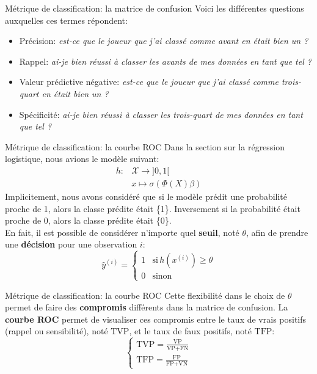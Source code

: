 \begin{frame}{Métrique de classification: la matrice de confusion}
	Voici les différentes questions auxquelles ces termes répondent:
	\begin{itemize}
		\item Précision: \textit{est-ce que le joueur que j'ai classé comme avant en était bien un ?}
		\item Rappel: \textit{ai-je bien réussi à classer les avants de mes données en tant que tel ?}
		\item Valeur prédictive négative: \textit{est-ce que le joueur que j'ai classé comme trois-quart en était bien un ?}
		\item Spécificité: \textit{ai-je bien réussi à classer les trois-quart de mes données en tant que tel ?}
	\end{itemize}
\end{frame}

\begin{frame}{Métrique de classification: la courbe ROC}
	Dans la section sur la régression logistique, nous avions le modèle suivant:
	\begin{equation}
		\begin{aligned}
			h: &\mathcal{X} \to ]0, 1[ \\
			&x \mapsto \sigma\left(\Phi(X) \beta\right)
		\end{aligned}
		\nonumber
	\end{equation}
	\pause
	Implicitement, nous avons considéré que si le modèle prédit une probabilité proche de 1, alors la classe prédite était \{1\}. Inversement si la probabilité était proche de 0, alors la classe prédite était \{0\}. \\
	\pause
	\vspace{0.3cm}
	En fait, il est possible de considérer n'importe quel \textbf{seuil}, noté $\theta$, afin de prendre une \textbf{décision} pour une observation $i$:
	\begin{equation}
		\hat{y}^{(i)} = 
		\begin{cases}
			1 & \text{si} \, h(x^{(i)}) \ge \theta \\
			0 & \text{sinon}
		\end{cases}
		\nonumber
	\end{equation}
\end{frame}

\begin{frame}{Métrique de classification: la courbe ROC}
	Cette flexibilité dans le choix de $\theta$ permet de faire des \textbf{compromis} différents dans la matrice de confusion. La \textbf{courbe ROC} permet de visualiser ces compromis entre le taux de vrais positifs (rappel ou sensibilité), noté $\text{TVP}$, et le taux de faux positifs, noté $\text{TFP}$:
	\begin{equation}
		\begin{cases}
			\text{TVP} = \displaystyle \frac{\text{VP}}{\text{VP} + \text{FN}} \\[10pt]
			\text{TFP} = \displaystyle \frac{\text{FP}}{\text{FP} + \text{VN}}
		\end{cases}
		\nonumber
	\end{equation}	
\end{frame}

